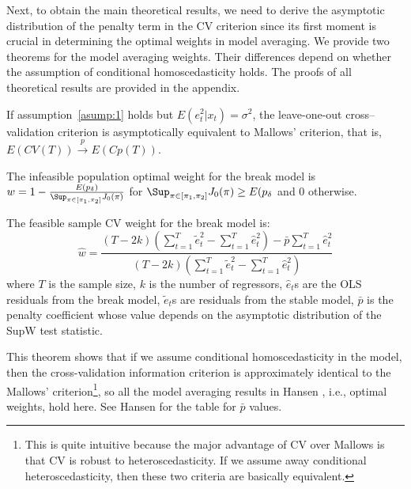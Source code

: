 Next, to obtain the main theoretical results, we need to derive the asymptotic distribution of the penalty term in the CV criterion since its first moment is crucial in determining the optimal weights in model averaging. We provide two theorems for the model averaging weights. Their differences depend on whether the assumption of conditional homoscedasticity holds. The proofs of all theoretical results are provided in the appendix.
\begin{proposition} \label{thm:1}
If assumption~\ref{asump:1} holds but $E(e_t^{2}|x_t) = \sigma^{2}$, the leave-one-out cross--validation criterion is asymptotically equivalent to Mallows' criterion, that is, $E(CV(T)) \stackrel{p}{\rightarrow} E(Cp(T))$.
\end{proposition}
\begin{corollary} \label{corollary:1}
The infeasible population optimal weight for the break model is $w = 1 - \frac{E(p_{\delta})}{\Sup_{\pi \in [\pi_{1}, \pi_{2}]}J_{0}(\pi)}$ for $\Sup_{\pi \in [\pi_{1}, \pi_{2}]}J_{0}(\pi) \geq E(p_{\delta}$ and $0$ otherwise. 
\end{corollary}
\begin{corollary} \label{corollary:2}
The feasible sample CV weight for the break model is:
\begin{equation}
\hat{w} = \frac{(T - 2k)(\sum_{t=1}^{T}\tilde{e}_{t}^{2} - \sum_{t=1}^{T}\hat{e}_{t}^{2}) - \bar{p}\sum_{t=1}^{T}\hat{e}_{t}^{2}}{(T - 2k)(\sum_{t=1}^{T}\tilde{e}_{t}^{2} - \sum_{t=1}^{T}\hat{e}_{t}^{2})}
\end{equation}
where $T$ is the sample size, $k$ is the number of regressors, $\hat{e}_t$s are the OLS residuals from the break model, $\tilde{e}_t$s are residuals from the stable model, $\bar{p}$ is the penalty coefficient whose value depends on the asymptotic distribution of the SupW test statistic.
\end{corollary}
This theorem shows that if we assume conditional homoscedasticity in the model, then the cross-validation information criterion is approximately identical to the Mallows' criterion\footnote{This is quite intuitive because the major advantage of CV over Mallows is that CV is robust to heteroscedasticity. If we assume away conditional heteroscedasticity, then these two criteria are basically equivalent.}, so all the model averaging results in Hansen \cite{hansen2009averaging}, i.e., optimal weights, hold here. See Hansen \cite{hansen2009averaging} for the table for $\bar{p}$ values.

